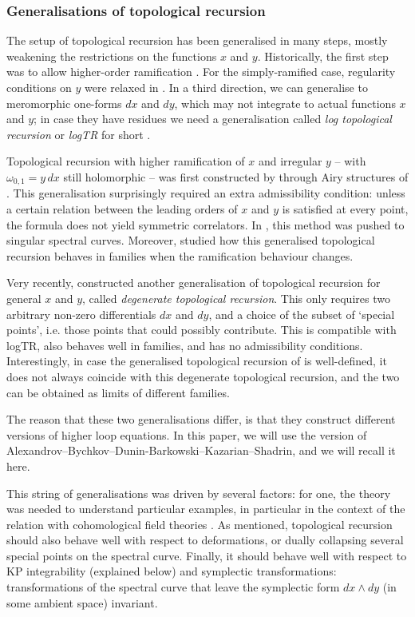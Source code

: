 \documentclass[10pt,a4paper,oneside,no-math,reqno]{amsart}%
\theoremstyle{plain}
\theoremstyle{definition}
\theoremstyle{remark}
\numberwithin{equation}{section}
\newcommand{\1}{\mathds{1}}
\newcommand{\<}{\langle}
\renewcommand{\>}{\rangle}
\begin{document}
\subsubsection{Generalisations of topological recursion}

The setup of topological recursion has been generalised in many steps, mostly weakening the restrictions on the functions $ x$ and $ y$. Historically, the first step was to allow higher-order ramification \cite{BE13}. For the simply-ramified case, regularity conditions on $y$ were relaxed in \cite{DN18,CN19}. In a third direction, we can generalise to meromorphic one-forms $ dx$ and $ dy$, which may not integrate to actual functions $ x$ and $y$; in case they have residues we need a generalisation called \emph{log topological recursion} or \emph{logTR} for short \cite{ABDKS24a}.

Topological recursion with higher ramification of $ x$ and irregular $y$ -- with $ \omega_{0,1} = y \, dx$ still holomorphic -- was first constructed by \cite{BBCCN24} through Airy structures of \cite{KS18}. This generalisation surprisingly required an extra admissibility condition: unless a certain relation between the leading orders of $ x$ and $ y$ is satisfied at every point, the formula does not yield symmetric correlators. In \cite{BKS24}, this method was pushed to singular spectral curves. Moreover, \cite{BBCKS25} studied how this generalised topological recursion behaves in families when the ramification behaviour changes. 

Very recently, \cite{ABDKS25} constructed another generalisation of topological recursion for general $x$ and $ y$, called \emph{degenerate topological recursion}. This only requires two arbitrary non-zero differentials $ dx$ and $ dy$, and a choice of the subset of `special points', i.e. those points that could possibly contribute. This is compatible with logTR, also behaves well in families, and has no admissibility conditions. Interestingly, in case the generalised topological recursion of \cite{BBCCN24} is well-defined, it does not always coincide with this degenerate topological recursion, and the two can be obtained as limits of different families.

The reason that these two generalisations differ, is that they construct different versions of higher loop equations. In this paper, we will use the version of Alexandrov--Bychkov--Dunin-Barkowski--Kazarian--Shadrin, and we will recall it here.
 
This string of generalisations was driven by several factors: for one, the theory was needed to understand particular examples, in particular in the context of the relation with cohomological field theories \cite{DOSS14,BCGS25}. As mentioned, topological recursion should also behave well with respect to deformations, or dually collapsing several special points on the spectral curve. Finally, it should behave well with respect to KP integrability (explained below) and symplectic transformations: transformations of the spectral curve that leave the symplectic form $ dx \wedge dy$ (in some ambient space) invariant.
\end{document}
